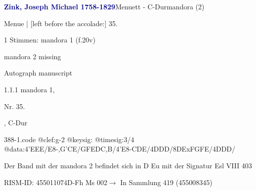 \documentclass[twocolumn, 12pt]{book}
\begin{document}
\par \vspace{16pt} \textcolor{darkblue}{\textbf{Zink, Joseph Michael  1758-1829}}\hfillplus{\textbf{[388]}}\newline Menuett - C-Dur\newline mandora (2)
\par \begin{itshape}[f.20v, at left:] Menue | [left before the accolade:] 35.\end{itshape} 
\par \textcolor{darkblue}{}  1 Stimmen: mandora 1  (f.20v)\newline \begin{small} mandora 2 missing\end{small} \newline Autograph manuscript
\par 1.1.1  mandora 1, \begin{itshape}Nr. 35.\end{itshape}, C-Dur  
\begin{filecontents*}{388-1.code}
@clef:g-2
@keysig:
@timesig:3/4
@data:4'EEE/E8-,G'CE/GFEDC,B/4'E8-CDE/4DDD/8DExFGFE/4DDD/
\end{filecontents*}
\newline %
\par Der Band mit der mandora 2 befindet sich in D Eu mit der Signatur Esl VIII 403
\par RISM-ID: 455011074\newline D-Fh  Ms 002\newline $\rightarrow$ In Sammlung 419 (455008345)
      
\end{document}
